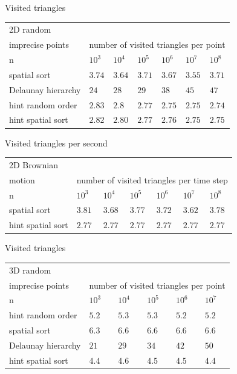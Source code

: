 \documentclass{beamer}
\begin{document}
\begin{frame}{Visited triangles}
\begin{tabular}{|l||l|l|l|l|l|l|}
\hline
2D random \\
imprecise points & \multicolumn{6}{|c|}{number of visited triangles per point}\\
 \hline \hline
    n & $10^3$ & $10^4$ & $10^5$ & $10^6$ & $10^7$ & $10^8$\\\hline
    spatial sort & $3.74$ & $3.64 $ & $3.71 $ & $3.67 $ & $3.55 $ & $3.71$\\\hline
    Delaunay hierarchy & $24$ & $28$ & $29$ & $38$ & $45$ & $47$\\\hline
    hint random order & $2.83 $ & $2.8 $ & $2.77 $ & $2.75 $ & $2.75$ & $2.74$\\\hline
    hint spatial sort & $2.82$ & $2.80$ & $2.77$ & $2.76$ & $2.75$ & $2.75$\\\hline
\end{tabular}
\end{frame}

\begin{frame}{Visited triangles per second}
\begin{tabular}{|l||l|l|l|l|l|l|}
\hline
2D Brownian \\
motion & \multicolumn{6}{|c|}{number of visited triangles per time step}\\
 \hline \hline
    n & $10^3$ & $10^4$ & $10^5$ & $10^6$ & $10^7$ & $10^8$\\\hline
    spatial sort & $3.81$ & $3.68 $ & $3.77 $ & $3.72 $ & $3.62 $ & $3.78$\\\hline
    hint spatial sort & $2.77$ & $2.77$ & $2.77$ & $2.77$ & $2.77$ & $2.77$\\\hline
\end{tabular}
\end{frame}

\begin{frame}{Visited triangles}
\begin{tabular}{|l||l|l|l|l|l|}
\hline
3D random \\
imprecise points & \multicolumn{5}{|c|}{number of visited triangles per point}\\
 \hline \hline
    n & $10^3$ & $10^4$ & $10^5$ & $10^6$ & $10^7$ \\\hline
    hint random order & $5.2 $ & $5.3 $ & $5.3$ & $5.2$ & $5.2$\\\hline
    spatial sort & $6.3$ & $6.6$ & $6.6$ & $6.6$ & $6.6$ \\\hline
    Delaunay hierarchy & $21$ & $29$ & $34$ & $42$ & $50$\\\hline
    hint spatial sort & $4.4$ & $4.6$ & $4.5$ & $4.5$ & $4.4$\\\hline
\end{tabular}
\end{frame}
\end{document}
